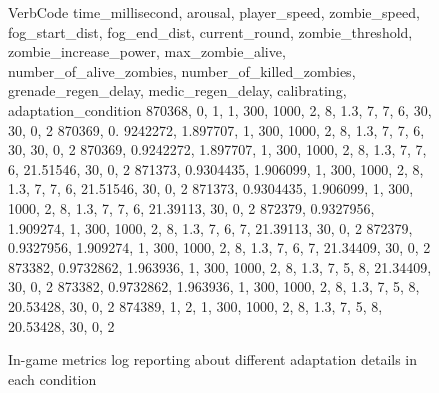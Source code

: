 \begin{figure}
  \centering
  \begin{SaveVerbatim}{VerbCode}
time_millisecond, arousal, player_speed, zombie_speed, fog_start_dist,
fog_end_dist, current_round, zombie_threshold, zombie_increase_power,
max_zombie_alive, number_of_alive_zombies, number_of_killed_zombies,
grenade_regen_delay, medic_regen_delay, calibrating, adaptation_condition
870368, 0,          1,        1, 300, 1000, 2, 8, 1.3, 7, 7, 6, 30,       30, 0, 2
870369, 0. 9242272, 1.897707, 1, 300, 1000, 2, 8, 1.3, 7, 7, 6, 30,       30, 0, 2
870369, 0.9242272,  1.897707, 1, 300, 1000, 2, 8, 1.3, 7, 7, 6, 21.51546, 30, 0, 2
871373, 0.9304435,  1.906099, 1, 300, 1000, 2, 8, 1.3, 7, 7, 6, 21.51546, 30, 0, 2
871373, 0.9304435,  1.906099, 1, 300, 1000, 2, 8, 1.3, 7, 7, 6, 21.39113, 30, 0, 2
872379, 0.9327956,  1.909274, 1, 300, 1000, 2, 8, 1.3, 7, 6, 7, 21.39113, 30, 0, 2
872379, 0.9327956,  1.909274, 1, 300, 1000, 2, 8, 1.3, 7, 6, 7, 21.34409, 30, 0, 2
873382, 0.9732862,  1.963936, 1, 300, 1000, 2, 8, 1.3, 7, 5, 8, 21.34409, 30, 0, 2
873382, 0.9732862,  1.963936, 1, 300, 1000, 2, 8, 1.3, 7, 5, 8, 20.53428, 30, 0, 2
874389, 1,          2,        1, 300, 1000, 2, 8, 1.3, 7, 5, 8, 20.53428, 30, 0, 2
\end{SaveVerbatim}
  \setlength{\fboxsep}{5mm}
  \caption{In-game metrics log reporting about different adaptation details in each condition}
  \label{txt:log-metrics}
\end{figure}
